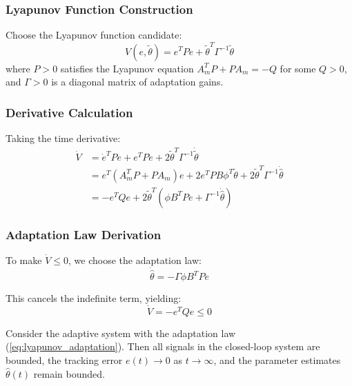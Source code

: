\subsubsection{Lyapunov Function Construction}

Choose the Lyapunov function candidate:
\begin{equation}
V(e, \tilde{\theta}) = e^T P e + \tilde{\theta}^T \Gamma^{-1} \tilde{\theta}
\label{eq:lyapunov_candidate}
\end{equation}
where $P > 0$ satisfies the Lyapunov equation $A_m^T P + P A_m = -Q$ for some $Q > 0$, and $\Gamma > 0$ is a diagonal matrix of adaptation gains.

\subsubsection{Derivative Calculation}

Taking the time derivative:
\begin{align}
\dot{V} &= \dot{e}^T P e + e^T P \dot{e} + 2\tilde{\theta}^T \Gamma^{-1} \dot{\tilde{\theta}} \nonumber \\
&= e^T(A_m^T P + P A_m)e + 2e^T P B \phi^T \tilde{\theta} + 2\tilde{\theta}^T \Gamma^{-1} \dot{\hat{\theta}} \nonumber \\
&= -e^T Q e + 2\tilde{\theta}^T(\phi B^T P e + \Gamma^{-1} \dot{\hat{\theta}})
\label{eq:V_dot}
\end{align}

\subsubsection{Adaptation Law Derivation}

To make $\dot{V} \leq 0$, we choose the adaptation law:
\begin{equation}
\boxed{
\dot{\hat{\theta}} = -\Gamma \phi B^T P e
}
\label{eq:lyapunov_adaptation}
\end{equation}

This cancels the indefinite term, yielding:
\begin{equation}
\dot{V} = -e^T Q e \leq 0
\label{eq:V_dot_final}
\end{equation}

\begin{theorem}
\label{thm:mrac_stability}
Consider the adaptive system with the adaptation law (\ref{eq:lyapunov_adaptation}). Then all signals in the closed-loop system are bounded, the tracking error $e(t) \to 0$ as $t \to \infty$, and the parameter estimates $\hat{\theta}(t)$ remain bounded.
\end{theorem}

